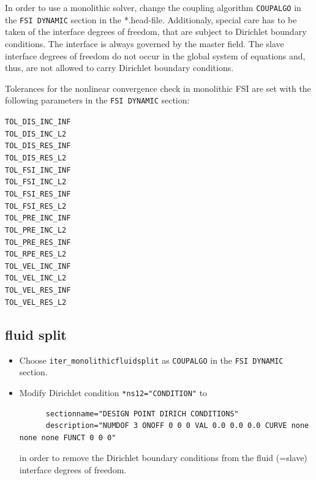 In order to use a monolithic solver, change the coupling algorithm
\verb|COUPALGO| in the \verb|FSI DYNAMIC| section in the *.head-file.
Additionaly, special care has to be taken of the interface degrees of freedom,
that are subject to Dirichlet boundary conditions. The interface is always
governed by the master field. The slave interface degrees of freedom do not
occur in the global system of equations and, thus, are not allowed to carry
Dirichlet boundary conditions.

Tolerances for the nonlinear convergence check in monolithic FSI are set with
the following parameters in the \verb|FSI DYNAMIC| section:
\begin{center}
  \verb|TOL_DIS_INC_INF|\\
  \verb|TOL_DIS_INC_L2|\\
  \verb|TOL_DIS_RES_INF|\\
  \verb|TOL_DIS_RES_L2|\\
  \verb|TOL_FSI_INC_INF|\\
  \verb|TOL_FSI_INC_L2|\\
  \verb|TOL_FSI_RES_INF|\\
  \verb|TOL_FSI_RES_L2|\\
  \verb|TOL_PRE_INC_INF|\\
  \verb|TOL_PRE_INC_L2|\\
  \verb|TOL_PRE_RES_INF|\\
  \verb|TOL_RPE_RES_L2|\\
  \verb|TOL_VEL_INC_INF|\\
  \verb|TOL_VEL_INC_L2|\\
  \verb|TOL_VEL_RES_INF|\\
  \verb|TOL_VEL_RES_L2|
\end{center}

\subsection{fluid split}

\begin{itemize}
  \item Choose \verb|iter_monolithicfluidsplit| as \verb|COUPALGO| in the
\verb|FSI DYNAMIC| section.
  \item Modify Dirichlet condition \verb|*ns12="CONDITION"| to 
  \begin{small}
    \begin{verbatim}
      sectionname="DESIGN POINT DIRICH CONDITIONS"
      description="NUMDOF 3 ONOFF 0 0 0 VAL 0.0 0.0 0.0 CURVE none none none FUNCT 0 0 0"
    \end{verbatim}
  \end{small}
  in order to remove the Dirichlet boundary conditions from the fluid (=slave)
  interface degrees of freedom.
\end{itemize}

